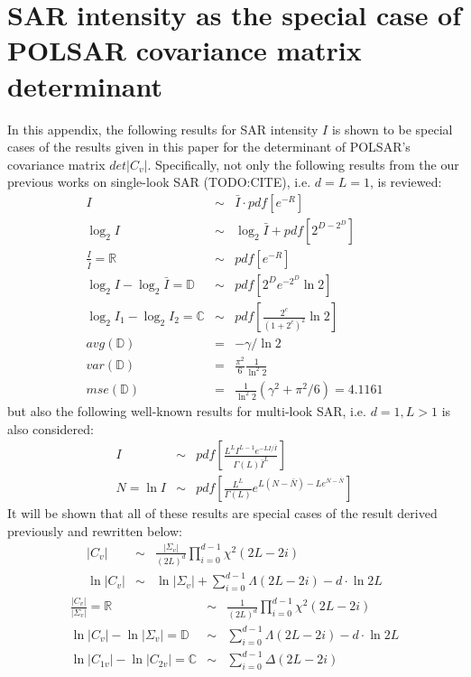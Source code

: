\documentclass[journal]{IEEEtran}
\begin{document}
\section{SAR intensity as the special case of POLSAR covariance matrix determinant}
\label{sec:appendix_sar_special_case_of_polsar}

In this appendix, the following results for SAR intensity $I$ is shown to be special cases of the results given in this paper for the determinant of POLSAR's covariance matrix $det|C_v|$.
Specifically, not only the following results from the our previous works on single-look SAR (TODO:CITE), i.e. $d=L=1$, is reviewed:
\begin{eqnarray}
  I &\sim& \bar{I} \cdot pdf \left[ e^{-R} \right] \\
  \log_2{I} &\sim& \log_2{\bar{I}} + pdf \left[ 2^{D-2^D} \right] \\
  \frac{I}{\bar{I}} = \mathbb{R} &\sim& pdf \left[ e^{-R} \right]  \\
  \log_2{I} - \log_2{\bar{I}} = \mathbb{D} &\sim& pdf \left[ 2^De^{-2^D}\ln2 \right]\\
  \log_2{I_1} - \log_2{I_2} = \mathbb{C} &\sim& pdf \left[ \frac{2^c}{(1+2^c)^2} \ln2 \right] \\
  avg(\mathbb{D}) &=& -\gamma / \ln{2} \\
  var(\mathbb{D}) &=& \frac{\pi^2}{6} \frac{1}{ \ln^2{2}} \\
  mse(\mathbb{D}) &=& \frac{1}{\ln^2{2}}( \gamma^2 + \pi^2/6 ) = 4.1161 
\end{eqnarray}
but also the following well-known results for multi-look SAR, i.e. $d=1,L>1$ is also considered:
  \begin{eqnarray}
I &\sim& pdf \left[ \frac{L^L I^{L-1} e^{-LI/\bar{I}}}{\Gamma(L) \bar{I}^L} \right] \\
N = \ln{I} &\sim& pdf \left[ \frac{L^L}{\Gamma(L)} e^{L(N-\bar{N})-Le^{N-\bar{N}}} \right]
  \end{eqnarray}
It will be shown that all of these results are special cases of the result derived previously and rewritten below:
\begin{eqnarray}
  |C_v| &\sim& \frac{|\Sigma_v|}{(2L)^d} \prod^{d-1}_{i=0} \chi^2(2L-2i)  \label{eqn:polsar_det_cov_dist} \\
  \ln{|C_v|} &\sim& \ln{|\Sigma_v|} + \sum^{d-1}_{i=0} \Lambda(2L-2i) - d \cdot \ln{2L} \label{eqn:polsar_log_det_cov_dist} 
\end{eqnarray}
\begin{eqnarray}
  \frac{|C_v|}{|\Sigma_v|} = \mathbb{R} &\sim& \frac{1}{(2L)^d} \prod^{d-1}_{i=0} \chi^2(2L-2i) \label{eqn:polsar_ratio_det_cov_dist} \\
  \ln{|C_v|} - \ln{|\Sigma_v|} = \mathbb{D} &\sim& \sum^{d-1}_{i=0} \Lambda(2L-2i) - d \cdot \ln{2L} \label{eqn:polsar_dispersion_log_det_cov_dist} \\ 
  \ln{|C_{1v}|} - \ln{|C_{2v}|} = \mathbb{C} &\sim& \sum^{d-1}_{i=0} \Delta(2L-2i)
\end{eqnarray}
\end{document}
